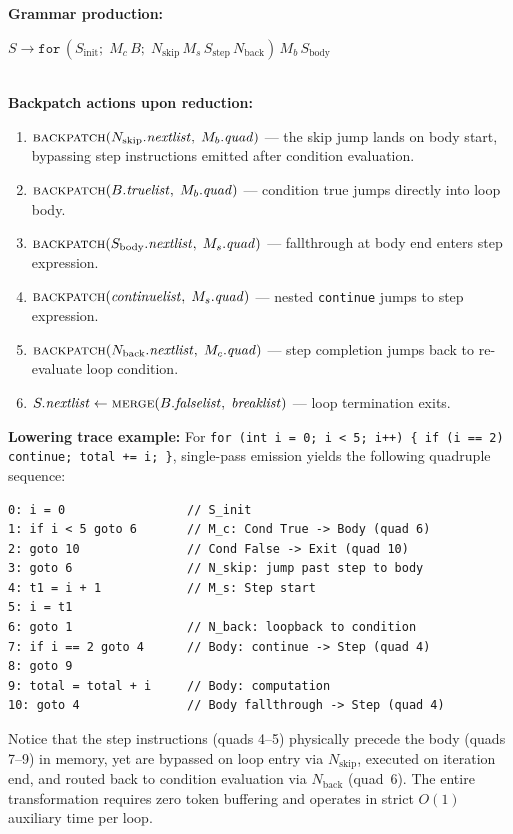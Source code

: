 \documentclass[conference]{IEEEtran}
\begin{document}
\noindent\textbf{Grammar production:}
\\[1pt]
\centerline{$S \to \texttt{for}\,(S_{\mathrm{init}};\; M_c\, B;\; N_{\mathrm{skip}}\, M_s\, S_{\mathrm{step}}\, N_{\mathrm{back}})\, M_b\, S_{\mathrm{body}}$}
\\[2pt]
\noindent\textbf{Backpatch actions upon reduction:}
\begin{enumerate}[leftmargin=*,itemsep=1pt,topsep=1pt]
\item $\textsc{backpatch}(N_{\mathrm{skip}}.\mathit{nextlist},\; M_b.\mathit{quad})$ --- the skip jump lands on body start, bypassing step instructions emitted after condition evaluation.
\item $\textsc{backpatch}(B.\mathit{truelist},\; M_b.\mathit{quad})$ --- condition true jumps directly into loop body.
\item $\textsc{backpatch}(S_{\mathrm{body}}.\mathit{nextlist},\; M_s.\mathit{quad})$ --- fallthrough at body end enters step expression.
\item $\textsc{backpatch}(\mathit{continuelist},\; M_s.\mathit{quad})$ --- nested \texttt{continue} jumps to step expression.
\item $\textsc{backpatch}(N_{\mathrm{back}}.\mathit{nextlist},\; M_c.\mathit{quad})$ --- step completion jumps back to re-evaluate loop condition.
\item $S.\mathit{nextlist} \leftarrow \textsc{merge}(B.\mathit{falselist},\; \mathit{breaklist})$ --- loop termination exits.
\end{enumerate}

\noindent\textbf{Lowering trace example:} For \texttt{for (int i = 0; i < 5; i++) \{ if (i == 2) continue; total += i; \}}, single-pass emission yields the following quadruple sequence:
\begin{lstlisting}[style=quad]
0: i = 0                 // S_init
1: if i < 5 goto 6       // M_c: Cond True -> Body (quad 6)
2: goto 10               // Cond False -> Exit (quad 10)
3: goto 6                // N_skip: jump past step to body
4: t1 = i + 1            // M_s: Step start
5: i = t1
6: goto 1                // N_back: loopback to condition
7: if i == 2 goto 4      // Body: continue -> Step (quad 4)
8: goto 9
9: total = total + i     // Body: computation
10: goto 4               // Body fallthrough -> Step (quad 4)
\end{lstlisting}
Notice that the step instructions (quads 4--5) physically precede the body (quads 7--9) in memory, yet are bypassed on loop entry via $N_{\mathrm{skip}}$, executed on iteration end, and routed back to condition evaluation via $N_{\mathrm{back}}$ (quad~6). The entire transformation requires zero token buffering and operates in strict $O(1)$ auxiliary time per loop.
\end{document}
